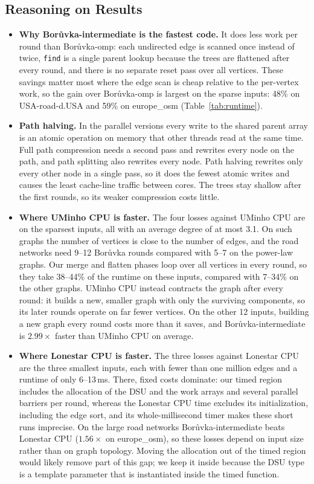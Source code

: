 \documentclass[11pt,a4paper]{article}
\begin{document}
\subsection*{Reasoning on Results}
\begin{itemize}
  \item \textbf{Why Bor\r{u}vka-intermediate is the fastest code.} It does less work per round
  than Bor\r{u}vka-omp: each undirected edge is scanned once instead of twice, \texttt{find} is a
  single parent lookup because the trees are flattened after every round, and there is no
  separate reset pass over all vertices. These savings matter most where the edge scan is cheap
  relative to the per-vertex work, so the gain over Bor\r{u}vka-omp is largest on the sparse
  inputs: 48\% on USA-road-d.USA and 59\% on europe\_osm (Table~\ref{tab:runtime}).

  \item \textbf{Path halving.} In the parallel versions every write to the shared parent array
  is an atomic operation on memory that other threads read at the same time. Full path
  compression needs a second pass and rewrites every node on the path, and path splitting also
  rewrites every node. Path halving rewrites only every other node in a single pass, so it does
  the fewest atomic writes and causes the least cache-line traffic between cores. The trees stay
  shallow after the first rounds, so its weaker compression costs little.

  \item \textbf{Where UMinho CPU is faster.} The four losses against UMinho CPU are on the
  sparsest inputs, all with an average degree of at most 3.1. On such graphs the number of
  vertices is close to the number of edges, and the road networks need 9--12 Bor\r{u}vka rounds
  compared with 5--7 on the power-law graphs. Our merge and flatten phases loop over all
  vertices in every round, so they take 38--44\% of the runtime on these inputs, compared with
  7--34\% on the other graphs. UMinho CPU instead contracts the graph after every round: it
  builds a new, smaller graph with only the surviving components, so its later rounds operate
  on far fewer vertices. On the other 12 inputs, building a new graph every round costs more
  than it saves, and Bor\r{u}vka-intermediate is $2.99\times$ faster than UMinho CPU on average.

  \item \textbf{Where Lonestar CPU is faster.} The three losses against Lonestar CPU are the
  three smallest inputs, each with fewer than one million edges and a runtime of only
  6--13\,ms. There, fixed costs dominate: our timed region includes the allocation of the DSU
  and the work arrays and several parallel barriers per round, whereas the Lonestar CPU time
  excludes its initialization, including the edge sort, and its whole-millisecond timer makes
  these short runs imprecise. On the large road networks Bor\r{u}vka-intermediate beats
  Lonestar CPU ($1.56\times$ on europe\_osm), so these losses depend on input size rather than
  on graph topology. Moving the allocation out of the timed region would likely remove part of
  this gap; we keep it inside because the DSU type is a template parameter that is instantiated
  inside the timed function.


\end{itemize}
\end{document}
